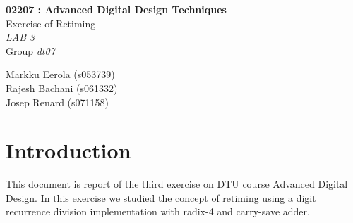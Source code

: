 \documentclass[11pt,a4paper]{article}
\begin{document}
	

\begin{titlepage}

\thispagestyle{fancy}
\lhead{}
\rhead{}
\rule{0pt}{50pt}
\vspace{3cm}

\begin{center}

 	\huge{\textbf{02207 : Advanced Digital Design Techniques}}\\
 	\vspace{1cm}
 	\huge{Exercise of Retiming}\\
 	\vspace{1cm}
 	\huge{\textit{LAB 3}}\\
 	\vspace{1cm}
 	\huge{Group \textit{dt07}}\\
\end{center}

\vspace{4cm}

\begin{flushright}
	\LARGE{Markku Eerola (s053739)}\\
	\vspace{0.3cm}
	\LARGE{Rajesh Bachani (s061332)}\\
	\vspace{0.3cm}
	\LARGE{Josep Renard (s071158)}\\
\end{flushright}
\cfoot{\today}
\end{titlepage}


\newpage 
\tableofcontents

\newpage 

\section{Introduction}
This document is report of the third exercise on DTU course Advanced Digital Design. In this exercise we studied the concept of retiming using a digit recurrence division implementation with radix-4 and carry-save adder.
\end{document}
